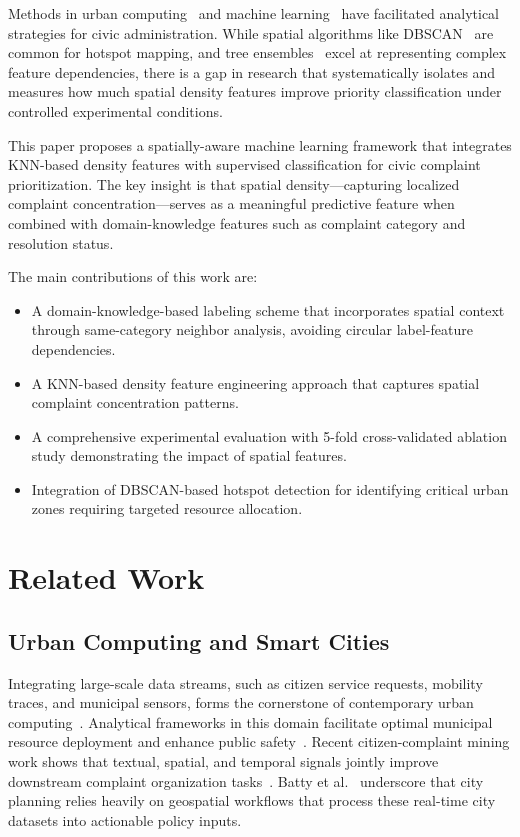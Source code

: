 \documentclass[12pt,onecolumn,draftclsnofoot]{IEEEtran}
\begin{document}
Methods in urban computing~\cite{zheng2014urban} and machine learning~\cite{bishop2006pattern} have facilitated analytical strategies for civic administration. While spatial algorithms like DBSCAN~\cite{ester1996dbscan} are common for hotspot mapping, and tree ensembles~\cite{breiman1984classification,breiman2001random} excel at representing complex feature dependencies, there is a gap in research that systematically isolates and measures how much spatial density features improve priority classification under controlled experimental conditions.

This paper proposes a spatially-aware machine learning framework that integrates KNN-based density features with supervised classification for civic complaint prioritization. The key insight is that spatial density---capturing localized complaint concentration---serves as a meaningful predictive feature when combined with domain-knowledge features such as complaint category and resolution status.

The main contributions of this work are:
\begin{itemize}
    \item A domain-knowledge-based labeling scheme that incorporates spatial context through same-category neighbor analysis, avoiding circular label-feature dependencies.
    \item A KNN-based density feature engineering approach that captures spatial complaint concentration patterns.
    \item A comprehensive experimental evaluation with 5-fold cross-validated ablation study demonstrating the impact of spatial features.
    \item Integration of DBSCAN-based hotspot detection for identifying critical urban zones requiring targeted resource allocation.
\end{itemize}

\section{Related Work}

\subsection{Urban Computing and Smart Cities}

Integrating large-scale data streams, such as citizen service requests, mobility traces, and municipal sensors, forms the cornerstone of contemporary urban computing~\cite{zheng2014urban}. Analytical frameworks in this domain facilitate optimal municipal resource deployment and enhance public safety~\cite{gharaibeh2017smart,silva2018towards}. Recent citizen-complaint mining work shows that textual, spatial, and temporal signals jointly improve downstream complaint organization tasks~\cite{gao2019star}. Batty et al.~\cite{batty2013big} underscore that city planning relies heavily on geospatial workflows that process these real-time city datasets into actionable policy inputs.
\end{document}

